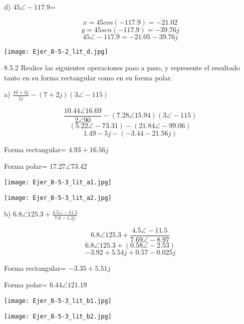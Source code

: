 \documentclass[a4paper, 11pt]{article}
\begin{document}
d) $45\angle-117.9$=

\begin{equation*}
x=45cos(-117.9)=-21.02
\end{equation*}
\begin{equation*}
y=45sen(-117.9)=-39.76j
\end{equation*}
\begin{equation*}
45\angle-117.9=-21.05-39.76j
\end{equation*}

\texttt{[image: Ejer\_8-5-2\_lit\_d.jpg]}

8.5.2 Realice las siguientes operaciones paso a paso, y represente el resultado tanto en su forma rectangular como en su forma polar.

a) $\frac{10+3j}{2j}-(7+2j)(3\angle-115)$

\begin{equation*}
\frac{10.44\angle16.69}{2\angle90}-(7.28\angle15.94)(3\angle-115)
\end{equation*}
\begin{equation*}
(5.22\angle-73.31)-(21.84\angle-99.06)
\end{equation*}
\begin{equation*}
1.49-5j-(-3.44-21.56j)
\end{equation*}

Forma rectangular= $4.93+16.56j$ 

Forma polar= $17.27\angle73.42$

\texttt{[image: Ejer\_8-5-3\_lit\_a1.jpg]}

\texttt{[image: Ejer\_8-5-3\_lit\_a2.jpg]}

b) $6.8\angle125.3+\frac{4.5\angle-11.5}{7.6-1.2j}$

\begin{equation*}
6.8\angle125.3+\frac{4.5\angle-11.5}{7.69\angle-8.97}
\end{equation*}
\begin{equation*}
6.8\angle125.3+(0.58\angle-2.53)
\end{equation*}
\begin{equation*}
-3.92+5.54j+0.57-0.025j
\end{equation*}

Forma rectangular= $-3.35+5.51j$ 

Forma polar= $6.44\angle121.19$

\texttt{[image: Ejer\_8-5-3\_lit\_b1.jpg]}

\texttt{[image: Ejer\_8-5-3\_lit\_b2.jpg]}
\end{document}
